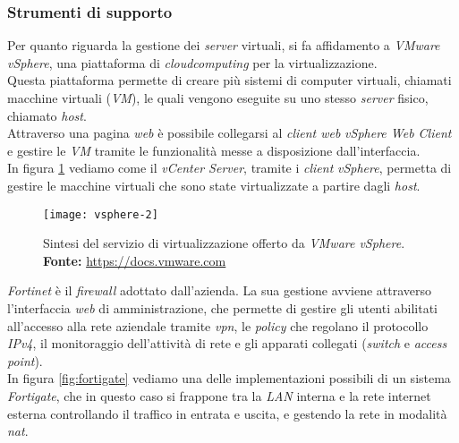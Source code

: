 \subsubsection{Strumenti di supporto}
Per quanto riguarda la gestione dei \textit{server} virtuali, si fa affidamento a \textit{VMware vSphere}, una piattaforma di \textit{\gls{cloudcomputing}\glsfirstoccur} per la virtualizzazione.\\ Questa piattaforma permette di creare più sistemi di computer virtuali, chiamati macchine virtuali (\textit{VM}), le quali vengono eseguite su uno stesso \textit{server} fisico, chiamato \textit{host}.\\ Attraverso una pagina \textit{web} è possibile collegarsi al \textit{client web} \textit{vSphere Web Client} e gestire le \textit{VM} tramite le funzionalità messe a disposizione dall'interfaccia.\\
In figura \ref{fig:virtualizzazione} vediamo come il \textit{vCenter Server}, tramite i \textit{client} \textit{vSphere}, permetta di gestire le macchine virtuali che sono state virtualizzate a partire dagli \textit{host}.

\vspace{20pt}

\begin{figure}[htbp]
	\begin{center}
		\texttt{[image: vsphere-2]}
		\caption{Sintesi del servizio di virtualizzazione offerto da \textit{VMware vSphere}. \newline \textbf{Fonte: } \url{https://docs.vmware.com}}
		\label{fig:virtualizzazione}
	\end{center}
\end{figure}

\vspace{15pt}

\textit{Fortinet} è il \textit{firewall} adottato dall'azienda. La sua gestione avviene attraverso l'interfaccia \textit{web} di amministrazione, che permette di gestire gli utenti abilitati all'accesso alla rete aziendale tramite \textit{\gls{vpn}\glsfirstoccur}, le \textit{policy} che regolano il protocollo \textit{IPv4}, il monitoraggio dell'attività di rete e gli apparati collegati (\textit{switch} e \textit{access point}).\\
In figura \ref{fig:fortigate} vediamo una delle implementazioni possibili di un sistema \textit{Fortigate}, che in questo caso si frappone tra la \textit{LAN} interna e la rete internet esterna controllando il traffico in entrata e uscita, e gestendo la rete in modalità \textit{\gls{nat}\glsfirstoccur}.

